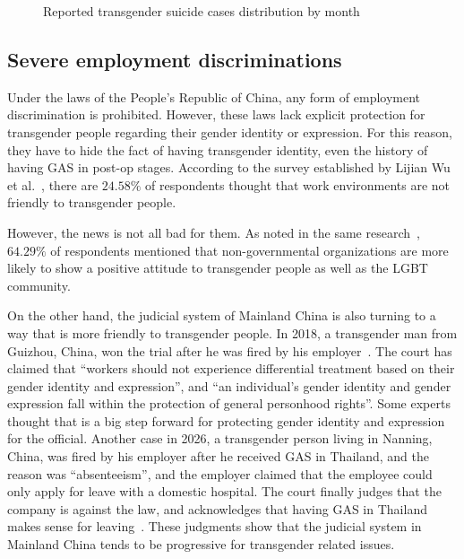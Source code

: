 \documentclass{article}
\begin{document}
		\begin{figure}[htbp]
			\centering
			\begin{tikzpicture}
				
			\end{tikzpicture}
			\caption{Reported transgender suicide cases distribution by month}\label{dis:suicide}
		\end{figure}

		\subsection{Severe employment discriminations}
		Under the laws of the People's Republic of China, any form of employment discrimination is prohibited. However, these laws lack explicit protection for transgender people regarding their gender identity or expression. For this reason, they have to hide the fact of having transgender identity, even the history of having GAS in post-op stages. According to the survey established by Lijian Wu et al.~\cite{Wu2017}, there are \(24.58\%\) of respondents thought that work environments are not friendly to transgender people. 

		However, the news is not all bad for them. As noted in the same research~\cite{Wu2017}, \(64.29\%\) of respondents mentioned that non-governmental organizations are more likely to show a positive attitude to transgender people as well as the LGBT community.

		On the other hand, the judicial system of Mainland China is also turning to a way that is more friendly to transgender people. In 2018, a transgender man from Guizhou, China, won the trial after he was fired by his employer~\cite{Zou2018}. The court has claimed that ``workers should not experience differential treatment based on their gender identity and expression'', and ``an individual's gender identity and gender expression fall within the protection of general personhood rights''. Some experts thought that is a big step forward for protecting gender identity and expression for the official. Another case in 2026, a transgender person living in Nanning, China, was fired by his employer after he received GAS in Thailand, and the reason was ``absenteeism'', and the employer claimed that the employee could only apply for leave with a domestic hospital. The court finally judges that the company is against the law, and acknowledges that having GAS in Thailand makes sense for leaving~\cite{Hao2026}. These judgments show that the judicial system in Mainland China tends to be progressive for transgender related issues.
\end{document}
